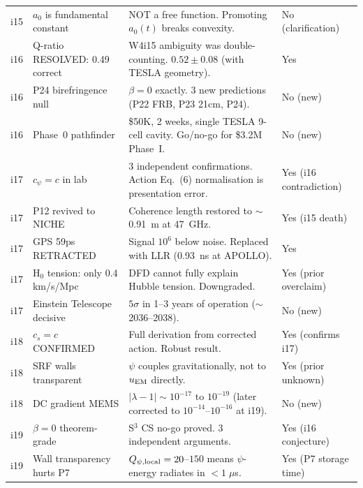 \documentclass[11pt,a4paper]{article}
\begin{document}
\begin{longtable}{p{1cm}p{3cm}p{7cm}p{2cm}}
i15 & $a_0$ is fundamental constant & NOT a free function. Promoting
$a_0(t)$ breaks convexity. & No (clarification) \\

i16 & Q-ratio RESOLVED: 0.49 correct & W4i15 ambiguity was
double-counting. $0.52 \pm 0.08$ (with TESLA geometry). & Yes \\

i16 & P24 birefringence null & $\beta = 0$ exactly. 3 new predictions
(P22 FRB, P23 21cm, P24). & No (new) \\

i16 & Phase~0 pathfinder & \$50K, 2 weeks, single TESLA 9-cell cavity.
Go/no-go for \$3.2M Phase~I. & No (new) \\

i17 & $c_\psi = c$ in lab & 3 independent confirmations. Action Eq.~(6)
normalisation is presentation error. & Yes (i16 contradiction) \\

i17 & P12 revived to NICHE & Coherence length restored to $\sim$0.91~m
at 47~GHz. & Yes (i15 death) \\

i17 & GPS 59ps RETRACTED & Signal $10^6$ below noise. Replaced with LLR
(0.93~ns at APOLLO). & Yes \\

i17 & H$_0$ tension: only 0.4 km/s/Mpc & DFD cannot fully explain
Hubble tension. Downgraded. & Yes (prior overclaim) \\

i17 & Einstein Telescope decisive & $5\sigma$ in 1--3 years of operation
($\sim$2036--2038). & No (new) \\

i18 & $c_s = c$ CONFIRMED & Full derivation from corrected action.
Robust result. & Yes (confirms i17) \\

i18 & SRF walls transparent & $\psi$ couples gravitationally, not to
$u_{\rm EM}$ directly. & Yes (prior unknown) \\

i18 & DC gradient MEMS & $|\lambda - 1| \sim 10^{-17}$ to $10^{-19}$
(later corrected to $10^{-14}$--$10^{-16}$ at i19). & No (new) \\

i19 & $\beta = 0$ theorem-grade & S$^3$ CS no-go proved. 3 independent
arguments. & Yes (i16 conjecture) \\

i19 & Wall transparency hurts P7 & $Q_{\psi,\rm local} = 20$--$150$
means $\psi$-energy radiates in $<1\;\mu$s. & Yes (P7 storage time) \\


\end{longtable}
\end{document}
